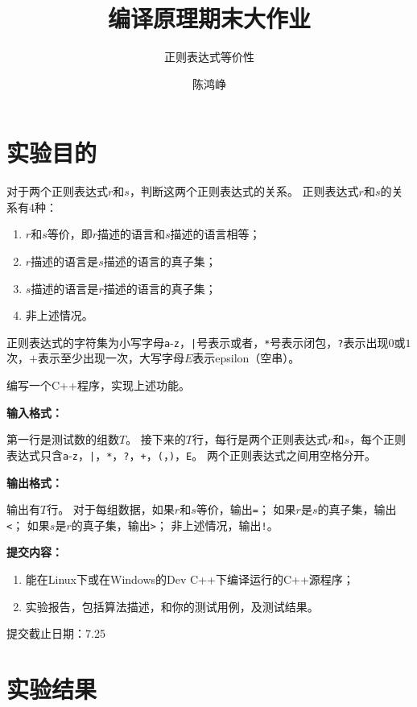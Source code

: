\documentclass[logo,reportComp]{thesis}
\title{编译原理期末大作业}
\subtitle{正则表达式等价性}
\author{陈鸿峥}
\begin{document}
\maketitle

\section{实验目的}
对于两个正则表达式$r$和$s$，判断这两个正则表达式的关系。
正则表达式$r$和$s$的关系有4种：
\begin{enumerate}
\item $r$和$s$等价，即$r$描述的语言和$s$描述的语言相等；
\item $r$描述的语言是$s$描述的语言的真子集；
\item $s$描述的语言是$r$描述的语言的真子集；
\item 非上述情况。
\end{enumerate}
正则表达式的字符集为小写字母\verb'a'-\verb'z'，\verb'|'号表示或者，\verb'*'号表示闭包，\verb'?'表示出现$0$或$1$次，$+$表示至少出现一次，大写字母$E$表示epsilon（空串）。

编写一个C++程序，实现上述功能。

\textbf{输入格式：}\par
第一行是测试数的组数$T$。
接下来的$T$行，每行是两个正则表达式$r$和$s$，每个正则表达式只含\verb'a'-\verb'z'，\verb'|'，\verb'*'，\verb'?'，\verb'+'，\verb'('，\verb')'，\verb'E'。
两个正则表达式之间用空格分开。

\textbf{输出格式：}\par
输出有$T$行。
对于每组数据，如果$r$和$s$等价，输出\verb'='；
如果$r$是$s$的真子集，输出\verb'<'；
如果$s$是$r$的真子集，输出\verb'>'；
非上述情况，输出\verb'!'。

\textbf{提交内容：}
\begin{enumerate}
	\item 能在Linux下或在Windows的Dev C++下编译运行的C++源程序；
	\item 实验报告，包括算法描述，和你的测试用例，及测试结果。
\end{enumerate}

提交截止日期：7.25

\section{实验结果}
\end{document}
